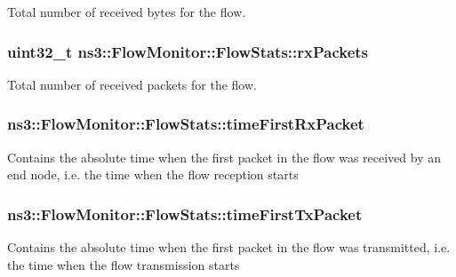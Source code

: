Total number of received bytes for the flow. 

\subsubsection[{\texorpdfstring{rx\+Packets}{rxPackets}}]{\setlength{\rightskip}{0pt plus 5cm}uint32\+\_\+t ns3\+::\+Flow\+Monitor\+::\+Flow\+Stats\+::rx\+Packets}\hypertarget{structns3_1_1FlowMonitor_1_1FlowStats_a175aa3e372c0e265a7f75f68e5316ee0}{}\label{structns3_1_1FlowMonitor_1_1FlowStats_a175aa3e372c0e265a7f75f68e5316ee0}


Total number of received packets for the flow. 

\subsubsection[{\texorpdfstring{time\+First\+Rx\+Packet}{timeFirstRxPacket}}]{ ns3\+::\+Flow\+Monitor\+::\+Flow\+Stats\+::time\+First\+Rx\+Packet}\hypertarget{structns3_1_1FlowMonitor_1_1FlowStats_ac67159b5cc3efc9cb59f48293d9db61c}{}\label{structns3_1_1FlowMonitor_1_1FlowStats_ac67159b5cc3efc9cb59f48293d9db61c}
Contains the absolute time when the first packet in the flow was received by an end node, i.\+e. the time when the flow reception starts 
\subsubsection[{\texorpdfstring{time\+First\+Tx\+Packet}{timeFirstTxPacket}}]{ ns3\+::\+Flow\+Monitor\+::\+Flow\+Stats\+::time\+First\+Tx\+Packet}\hypertarget{structns3_1_1FlowMonitor_1_1FlowStats_af3ce626d34564326c630e0f85bf8e060}{}\label{structns3_1_1FlowMonitor_1_1FlowStats_af3ce626d34564326c630e0f85bf8e060}
Contains the absolute time when the first packet in the flow was transmitted, i.\+e. the time when the flow transmission starts 
